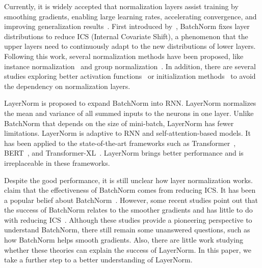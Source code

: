 \documentclass{article}
\begin{document}
Currently, it is widely accepted that normalization layers assist training by smoothing gradients, enabling large learning rates, accelerating convergence, and improving generalization results~\citep{DBLP:journals/corr/abs-1901-09321}. 
First introduced by~\citet{ioffe2015batch}, BatchNorm fixes layer distributions to reduce ICS (Internal Covariate Shift), a phenomenon that the upper layers need to continuously adapt to the new distributions of lower layers.  
Following this work, several normalization methods have been proposed, like instance normalization~\citep{DBLP:journals/corr/UlyanovVL16} and group normalization~\citep{DBLP:conf/eccv/WuH18}. In addition, there are several studies exploring better activation functions~\citep{klambauer2017self} or initialization methods~\citep{DBLP:journals/corr/abs-1901-09321} to avoid the dependency on normalization layers. 


LayerNorm is proposed to expand BatchNorm into RNN. LayerNorm normalizes the mean and variance of all summed inputs to the neurons in one layer. Unlike BatchNorm that depends on the size of mini-batch, LayerNorm has fewer limitations. LayerNorm is adaptive to RNN and self-attention-based models. It has been applied to the state-of-the-art frameworks such as  Transformer~\citep{DBLP:conf/nips/VaswaniSPUJGKP17}, BERT~\citep{devlin2018bert}, and Transformer-XL~\citep{dai2019transformer}. LayerNorm brings better performance and is irreplaceable in these frameworks. 



Despite the good performance, it is still unclear how layer normalization works. 
~\citet{ioffe2015batch} claim that the effectiveness of BatchNorm comes from reducing ICS. 
It has been a popular belief about BatchNorm~\citep{santurkar2018does}. 
However, some recent studies point out that the success of BatchNorm relates to the smoother gradients and has little to do with reducing ICS~\citep{santurkar2018does,DBLP:conf/nips/BjorckGSW18}. Although these studies provide a pioneering perspective to understand BatchNorm, there still remain some unanswered questions, such as how BatchNorm helps smooth gradients. 
Also, there are little work studying whether these theories can explain the success of LayerNorm. In this paper, we take a further step to a better understanding of LayerNorm. 
\end{document}
